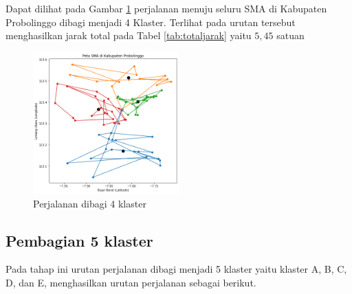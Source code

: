 Dapat dilihat pada Gambar \ref{fig:hasil_mtsp4} perjalanan menuju seluru SMA di Kabupaten Probolinggo dibagi menjadi 4 Klaster. Terlihat pada urutan tersebut menghasilkan jarak total pada Tabel \ref{tab:totaljarak} yaitu $5,45$ satuan

\begin{figure}[H]
\centering
\includegraphics[width=0.5\textwidth]{Gambar/hasil_mtsp/4}
\caption{Perjalanan dibagi 4 klaster}
\label{fig:hasil_mtsp4}
\end{figure}

\subsection{Pembagian 5 klaster}

Pada tahap ini urutan perjalanan dibagi menjadi 5 klaster yaitu klaster A, B, C, D, dan E, menghasilkan urutan perjalanan sebagai berikut.

